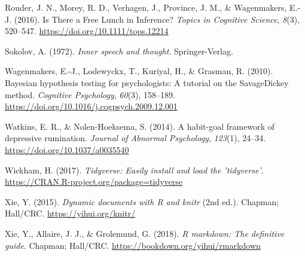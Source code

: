 \documentclass[
  english,
  man, donotrepeattitle,floatsintext]{apa6}
\newlength{\cslhangindent}
\newenvironment{cslreferences}%
  {\setlength{\parindent}{0pt}%
  \everypar{\setlength{\hangindent}{\cslhangindent}}\ignorespaces}%
  {\par}
\begin{document}
\begin{cslreferences}
\leavevmode\hypertarget{ref-rouder_is_2016}{}%
Rouder, J. N., Morey, R. D., Verhagen, J., Province, J. M., \& Wagenmakers, E.-J. (2016). Is There a Free Lunch in Inference? \emph{Topics in Cognitive Science}, \emph{8}(3), 520--547. \url{https://doi.org/10.1111/tops.12214}

\leavevmode\hypertarget{ref-sokolov_inner_1972}{}%
Sokolov, A. (1972). \emph{Inner speech and thought}. Springer-Verlag.

\leavevmode\hypertarget{ref-wagenmakers_bayesian_2010}{}%
Wagenmakers, E.-J., Lodewyckx, T., Kuriyal, H., \& Grasman, R. (2010). Bayesian hypothesis testing for psychologists: A tutorial on the SavageDickey method. \emph{Cognitive Psychology}, \emph{60}(3), 158--189. \url{https://doi.org/10.1016/j.cogpsych.2009.12.001}

\leavevmode\hypertarget{ref-watkins_habit-goal_2014}{}%
Watkins, E. R., \& Nolen-Hoeksema, S. (2014). A habit-goal framework of depressive rumination. \emph{Journal of Abnormal Psychology}, \emph{123}(1), 24--34. \url{https://doi.org/10.1037/a0035540}

\leavevmode\hypertarget{ref-R-tidyverse}{}%
Wickham, H. (2017). \emph{Tidyverse: Easily install and load the 'tidyverse'}. \url{https://CRAN.R-project.org/package=tidyverse}

\leavevmode\hypertarget{ref-R-knitr}{}%
Xie, Y. (2015). \emph{Dynamic documents with R and knitr} (2nd ed.). Chapman; Hall/CRC. \url{https://yihui.org/knitr/}

\leavevmode\hypertarget{ref-R-rmarkdown}{}%
Xie, Y., Allaire, J. J., \& Grolemund, G. (2018). \emph{R markdown: The definitive guide}. Chapman; Hall/CRC. \url{https://bookdown.org/yihui/rmarkdown}
\end{cslreferences}
\end{document}
